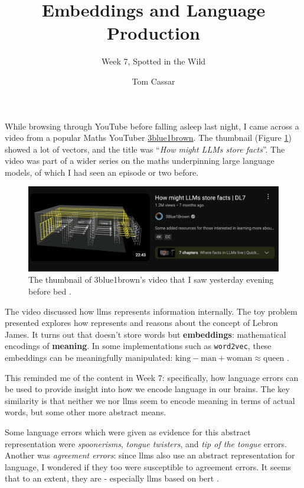 \documentclass[fontsize=12pt]{article}
\title{Embeddings and Language Production}
\author{Week 7, Spotted in the Wild}
\date{Tom Cassar}
\begin{document}

\maketitle

While browsing through YouTube before falling asleep last night, I came across a
video from a popular Maths YouTuber 
\href{https://www.youtube.com/@3blue1brown}{3blue1brown}. The thumbnail (Figure
\ref{fig:thumbnail}) showed a
lot of vectors, and the title was ``\textit{How might LLMs store facts}''. The
video was part of a wider series on the maths underpinning large language
models, of which I had seen an episode or two before. \newline 

\begin{figure}[H]
    \centering
    \includegraphics[width=0.8 \linewidth]{./img/thumbnail.png} 
    \caption{The thumbnail of 3blue1brown's video that I saw yesterday evening
    before bed \cite{3Blue1Brown_2024}.}
    \label{fig:thumbnail}
\end{figure}

The video discussed how \acp{llm} represents information internally. The toy
problem presented explores how  represents and reasons about the
concept of Lebron James. It turns out that  doesn't store words
but \textbf{embeddings}: mathematical encodings of \textbf{meaning}. In some
implementations such as \texttt{word2vec}, these embeddings can be meaningfully
manipulated: $\text{king} - \text{man} + \text{woman} \approx \text{queen}$
\cite{tensorflow_word_embeddings}. \newline

This reminded me of the content in Week 7: specifically, how language errors can
be used to provide insight into how we encode language in our brains. The key
similarity is that neither we nor \acp{llm} seem to encode meaning in terms of
actual words, but some other more abstract means. \newline

Some language errors which were given as evidence for this abstract
representation were \textit{spoonerisms}, \textit{tongue twisters}, and
\textit{tip of the tongue} errors. Another was \textit{agreement errors}: since
\acp{llm} also use an abstract representation for language, I wondered if they
too were susceptible to agreement errors. It seems that to an extent, they are -
especially \acp{llm} based on \ac{bert} \cite{bazhukov-etal-2024-models}.



\end{document}
